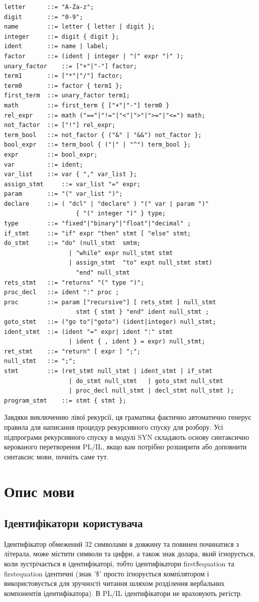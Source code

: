 \documentclass{memoir}
\begin{document}
\begin{lstlisting}
letter		::= "A-Za-z";
digit 		::= "0-9";
name 		::= letter { letter | digit };
integer 	::= digit { digit };
ident 		::= name | label;
factor 		::= (ident | integer | "(" expr ")" );
unary_factor 	::= ["+"|"-"] factor;
term1 		::= ["*"|"/"] factor;
term0 		::= factor { term1 };
first_term 	::= unary_factor term1;
math 		::= first_term { ["+"|"-"] term0 }
rel_expr 	::= math ("=="|"!="|"<"|">"|">="|"<=") math;
not_factor 	::= ["!"] rel_expr;
term_bool 	::= not_factor { ("&" | "&&") not_factor };
bool_expr 	::= term_bool { ("|" | "^") term_bool };
expr 		::= bool_expr;
var 		::= ident;
var_list 	::= var { "," var_list };
assign_stmt 	::= var_list "=" expr;
param 		::= "(" var_list ")";
declare 	::= ( "dcl" | "declare" ) "(" var | param ")"
                    { "(" integer ")" } type;
type		::= "fixed"|"binary"|"float"|"decimal" ;
if_stmt 	::= "if" expr "then" stmt [ "else" stmt;
do_stmt 	::= "do" (null_stmt  smtm;
                  | "while" expr null_stmt stmt
                  | assign_stmt  "to" expt null_stmt stmt)
                    "end" null_stmt
rets_stmt	::= "returns" "(" type ")";
proc_decl 	::= ident ":" proc ;
proc 		::= param ["recursive"] [ rets_stmt ] null_stmt
                    stmt { stmt } "end" ident null_stmt ;
goto_stmt 	::= ("go to"|"goto") (ident|integer) null_stmt;
ident_stmt 	::= (ident "=" expr| ident ":" stmt
                  | ident { , ident } = expr) null_stmt;
ret_stmt 	::= "return" [ expr ] ";";
null_stmt 	::= ";";
stmt 		::= (ret_stmt null_stmt | ident_stmt | if_stmt
                  | do_stmt null_stmt   | goto_stmt null_stmt
                  | proc_decl null_stmt | decl_stmt null_stmt );
program_stmt	::= stmt { stmt };
\end{lstlisting}
Завдяки виключенню лівої рекурсії, ця граматика фактично автоматично генерує
правила для написання процедур рекурсивного спуску для розбору. Усі підпрограми
рекурсивного спуску в модулі SYN складають основу синтаксично керованого
перетворення PL/IL, якщо вам потрібно розширити або доповнити синтаксис
мови, почніть саме тут.

\section{Опис мови}
\subsection{Ідентифікатори користувача}
Ідентифікатор обмежений 32 символами в довжину та повинен починатися з літерала,
може містити символи та цифри, а також знак долара, який ігнорується, коли
зустрічається в ідентифікаторі, тобто ідентифікатори first\$equation та
firstequation ідентичні (знак '\$' просто ігнорується компілятором і
використовується для зручності читання шляхом розділення вербальних
компонентів ідентифікатора). В PL/IL ідентифікатори не враховують регістр.
\end{document}
